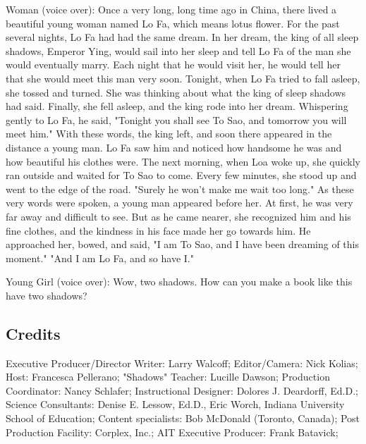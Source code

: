 Woman (voice over): Once a very long, long time ago in China, there lived a beautiful young woman named Lo Fa, which means lotus flower. For the past several nights, Lo Fa had had the same dream. In her dream, the king of all sleep shadows, Emperor Ying, would sail into her sleep and tell Lo Fa of the man she would eventually marry. Each night that he would visit her, he would tell her that she would meet this man very soon. Tonight, when Lo Fa tried to fall asleep, she tossed and turned. She was thinking about what the king of sleep shadows had said. Finally, she fell asleep, and the king rode into her dream. Whispering gently to Lo Fa, he said, "Tonight you shall see To Sao, and tomorrow you will meet him." With these words, the king left, and soon there appeared in the distance a young man. Lo Fa saw him and noticed how handsome he was and how beautiful his clothes were. The next morning, when Loa woke up, she quickly ran outside and waited for To Sao to come. Every few minutes, she stood up and went to the edge of the road. "Surely he won't make me wait too long." As these very words were spoken, a young man appeared before her. At first, he was very far away and difficult to see. But as he came nearer, she recognized him and his fine clothes, and the kindness in his face made her go towards him. He approached her, bowed, and said, "I am To Sao, and I have been dreaming of this moment." "And I am Lo Fa, and so have I."

Young Girl (voice over): Wow, two shadows. How can you make a book like this have two shadows?

\subsection{Credits}

Executive Producer/Director Writer: Larry Walcoff;
Editor/Camera: Nick Kolias;
Host: Francesca Pellerano;
"Shadows" Teacher: Lucille Dawson;
Production Coordinator: Nancy Schlafer;
Instructional Designer: Dolores J. Deardorff, Ed.D.;
Science Consultants: Denise E. Lessow, Ed.D., Eric Worch, Indiana University School of Education;
Content specialists: Bob McDonald (Toronto, Canada);
Post Production Facility: Corplex, Inc.;
AIT Executive Producer: Frank Batavick;